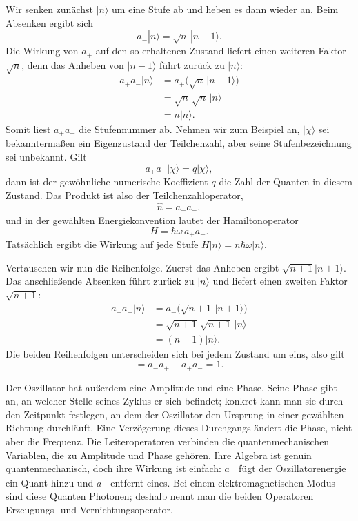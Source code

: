 Wir senken zunächst \(|n\rangle\) um eine Stufe ab und heben es dann wieder an. Beim Absenken ergibt sich
\begin{equation}
a_-|n\rangle=\sqrt n\,|n-1\rangle.
\end{equation}
Die Wirkung von \(a_+\) auf den so erhaltenen Zustand liefert einen weiteren Faktor \(\sqrt n\), denn das Anheben von \(|n-1\rangle\) führt zurück zu \(|n\rangle\):
\begin{align}
a_+a_-|n\rangle
&=a_+\bigl(\sqrt n\,|n-1\rangle\bigr)\\
&=\sqrt n\,\sqrt n\,|n\rangle\\
&=n|n\rangle.
\end{align}
Somit liest \(a_+a_-\) die Stufennummer ab. Nehmen wir zum Beispiel an, \(|\chi\rangle\) sei bekanntermaßen ein Eigenzustand der Teilchenzahl, aber seine Stufenbezeichnung sei unbekannt. Gilt
\begin{equation}
a_+a_-|\chi\rangle=q|\chi\rangle,
\end{equation}
dann ist der gewöhnliche numerische Koeffizient \(q\) die Zahl der Quanten in diesem Zustand. Das Produkt ist also der Teilchenzahloperator,
\begin{equation}
\hat n=a_+a_-,
\end{equation}
und in der gewählten Energiekonvention lautet der Hamiltonoperator
\begin{equation}
H=\hbar\omega\,a_+a_-.
\end{equation}
Tatsächlich ergibt die Wirkung auf jede Stufe \(H|n\rangle=n\hbar\omega|n\rangle\).

Vertauschen wir nun die Reihenfolge. Zuerst das Anheben ergibt \(\sqrt{n+1}|n+1\rangle\). Das anschließende Absenken führt zurück zu \(|n\rangle\) und liefert einen zweiten Faktor \(\sqrt{n+1}\):
\begin{align}
a_-a_+|n\rangle
&=a_-\bigl(\sqrt{n+1}\,|n+1\rangle\bigr)\\
&=\sqrt{n+1}\,\sqrt{n+1}\,|n\rangle\\
&=(n+1)|n\rangle.
\end{align}
Die beiden Reihenfolgen unterscheiden sich bei jedem Zustand um eins, also gilt
\begin{equation}
[a_-,a_+]=a_-a_+-a_+a_-=1.
\end{equation}

Der Oszillator hat außerdem eine Amplitude und eine Phase. Seine Phase gibt an, an welcher Stelle seines Zyklus er sich befindet; konkret kann man sie durch den Zeitpunkt festlegen, an dem der Oszillator den Ursprung in einer gewählten Richtung durchläuft. Eine Verzögerung dieses Durchgangs ändert die Phase, nicht aber die Frequenz. Die Leiteroperatoren verbinden die quantenmechanischen Variablen, die zu Amplitude und Phase gehören. Ihre Algebra ist genuin quantenmechanisch, doch ihre Wirkung ist einfach: \(a_+\) fügt der Oszillatorenergie ein Quant hinzu und \(a_-\) entfernt eines. Bei einem elektromagnetischen Modus sind diese Quanten Photonen; deshalb nennt man die beiden Operatoren Erzeugungs- und Vernichtungsoperator.

